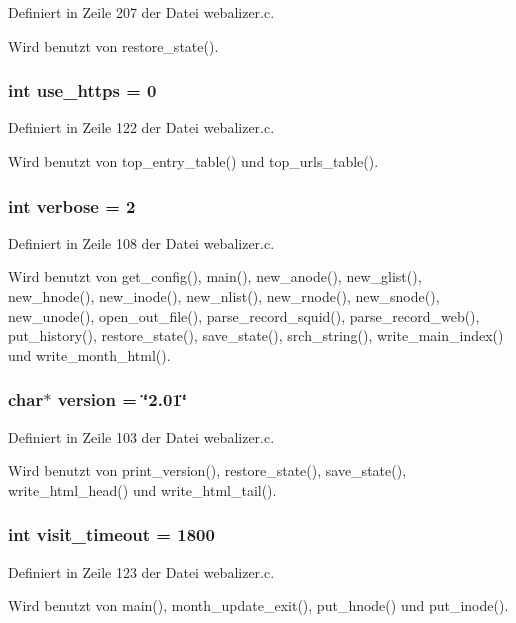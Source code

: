 Definiert in Zeile 207 der Datei webalizer.c.

Wird benutzt von restore\_\-state().
\subsubsection{\setlength{\rightskip}{0pt plus 5cm}int {\bf use\_\-https} = 0}\label{webalizer_8c_d821baa693a77d314549e3556fd6534a}




Definiert in Zeile 122 der Datei webalizer.c.

Wird benutzt von top\_\-entry\_\-table() und top\_\-urls\_\-table().
\subsubsection{\setlength{\rightskip}{0pt plus 5cm}int {\bf verbose} = 2}\label{webalizer_8c_0b2caeb4b6f130be43e5a2f0267dd453}




Definiert in Zeile 108 der Datei webalizer.c.

Wird benutzt von get\_\-config(), main(), new\_\-anode(), new\_\-glist(), new\_\-hnode(), new\_\-inode(), new\_\-nlist(), new\_\-rnode(), new\_\-snode(), new\_\-unode(), open\_\-out\_\-file(), parse\_\-record\_\-squid(), parse\_\-record\_\-web(), put\_\-history(), restore\_\-state(), save\_\-state(), srch\_\-string(), write\_\-main\_\-index() und write\_\-month\_\-html().
\subsubsection{\setlength{\rightskip}{0pt plus 5cm}char$\ast$ {\bf version} = \char`\"{}2.01\char`\"{}}\label{webalizer_8c_56abfaab87c46691c1ef3ad0df23e864}




Definiert in Zeile 103 der Datei webalizer.c.

Wird benutzt von print\_\-version(), restore\_\-state(), save\_\-state(), write\_\-html\_\-head() und write\_\-html\_\-tail().
\subsubsection{\setlength{\rightskip}{0pt plus 5cm}int {\bf visit\_\-timeout} = 1800}\label{webalizer_8c_95c29ea4f1f207b5be0cdd3cefa935d1}




Definiert in Zeile 123 der Datei webalizer.c.

Wird benutzt von main(), month\_\-update\_\-exit(), put\_\-hnode() und put\_\-inode().